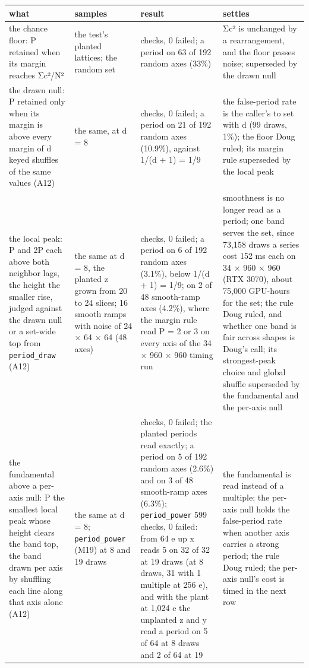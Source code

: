 {\footnotesize
\setlength{\tabcolsep}{6pt}
\begin{longtable}{>{\RaggedRight\arraybackslash}p{}>{\RaggedRight\arraybackslash}p{}>{\RaggedRight\arraybackslash}p{}>{\RaggedRight\arraybackslash}p{}}
\toprule
what & samples & result & settles \\
\midrule
\endhead
the chance floor: P retained when its margin reaches Σc²/N² & the test's planted lattices; the random set & 431 checks, 0 failed; a period on 63 of 192 random axes (33\%) & Σc² is unchanged by a rearrangement, and the floor passes noise; superseded by the drawn null \\
the drawn null: P retained only when its margin is above every margin of d keyed shuffles of the same values (A12) & the same, at d = 8 & 502 checks, 0 failed; a period on 21 of 192 random axes (10.9\%), against 1/(d + 1) = 1/9 & the false-period rate is the caller's to set with d (99 draws, 1\%); the floor Doug ruled; its margin rule superseded by the local peak \\
the local peak: P and 2P each above both neighbor lags, the height the smaller rise, judged against the drawn null or a set-wide top from \texttt{period\_\allowbreak{}draw} (A12) & the same at d = 8, the planted z grown from 20 to 24 slices; 16 smooth ramps with noise of 24 × 64 × 64 (48 axes) & 700 checks, 0 failed; a period on 6 of 192 random axes (3.1\%), below 1/(d + 1) = 1/9; on 2 of 48 smooth-ramp axes (4.2\%), where the margin rule read P = 2 or 3 on every axis of the 34 × 960 × 960 timing run & smoothness is no longer read as a period; one band serves the set, since 73,158 draws a series cost 152 ms each on 34 × 960 × 960 (RTX 3070), about 75,000 GPU-hours for the set; the rule Doug ruled, and whether one band is fair across shapes is Doug's call; its strongest-peak choice and global shuffle superseded by the fundamental and the per-axis null \\
the fundamental above a per-axis null: P the smallest local peak whose height clears the band top, the band drawn per axis by shuffling each line along that axis alone (A12) & the same at d = 8; \texttt{period\_\allowbreak{}power} (M19) at 8 and 19 draws & 700 checks, 0 failed; the planted periods read exactly; a period on 5 of 192 random axes (2.6\%) and on 3 of 48 smooth-ramp axes (6.3\%); \texttt{period\_\allowbreak{}power} 599 checks, 0 failed: from 64 e up x reads 5 on 32 of 32 at 19 draws (at 8 draws, 31 with 1 multiple at 256 e), and with the plant at 1,024 e the unplanted z and y read a period on 5 of 64 at 8 draws and 2 of 64 at 19 & the fundamental is read instead of a multiple; the per-axis null holds the false-period rate when another axis carries a strong period; the rule Doug ruled; the per-axis null's cost is timed in the next row \\

\end{longtable}}
